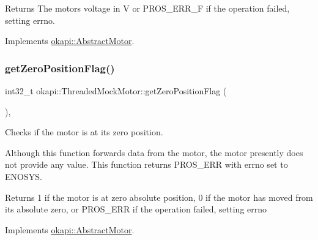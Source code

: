 \begin{DoxyReturn}{Returns}
The motor\textquotesingle{}s voltage in V or P\+R\+O\+S\+\_\+\+E\+R\+R\+\_\+F if the operation failed, setting errno. 
\end{DoxyReturn}


Implements \mbox{\hyperlink{classokapi_1_1AbstractMotor_a855b35b508e90074f21662b06ad2a0c8}{okapi\+::\+Abstract\+Motor}}.

\mbox{\label{classokapi_1_1ThreadedMockMotor_a7433d665a1932327fa11b82e9f01d7b2}} 
\subsubsection{\texorpdfstring{getZeroPositionFlag()}{getZeroPositionFlag()}}
{\footnotesize\ttfamily int32\+\_\+t okapi\+::\+Threaded\+Mock\+Motor\+::get\+Zero\+Position\+Flag (\begin{DoxyParamCaption}{ }\end{DoxyParamCaption})\hspace{0.3cm}{\ttfamily [override]}, {\ttfamily [virtual]}}



Checks if the motor is at its zero position. 

Although this function forwards data from the motor, the motor presently does not provide any value. This function returns P\+R\+O\+S\+\_\+\+E\+RR with errno set to E\+N\+O\+S\+YS.

\begin{DoxyReturn}{Returns}
1 if the motor is at zero absolute position, 0 if the motor has moved from its absolute zero, or P\+R\+O\+S\+\_\+\+E\+RR if the operation failed, setting errno 
\end{DoxyReturn}


Implements \mbox{\hyperlink{classokapi_1_1AbstractMotor_a07079ee87a07b98b7008f2ce91c645ea}{okapi\+::\+Abstract\+Motor}}.

\mbox{\label{classokapi_1_1ThreadedMockMotor_adfd72da84998458589114912eb2050af}} 

